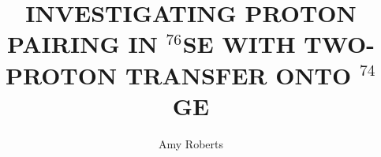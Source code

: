 \documentclass[textrefs,final,noinfo,12pt]{nddiss2ePJL}
\newcommand{\Ge}[1]{$^{#1}$Ge\xspace}
\newcommand{\Se}[1]{$^{#1}$Se\xspace}
\newcommand{\reaction}{$^{74,76}$Ge($^3$He,n)$^{76,78}$Se\xspace}
\newcommand{\zvbb}{$0\nu\beta\beta$\xspace}
\newcommand{\zp}{$0^+$\xspace}
\begin{document}
\frontmatter

\title{INVESTIGATING PROTON PAIRING IN $^{76}$SE WITH TWO-PROTON TRANSFER ONTO $^{74}$GE}
\author{Amy Roberts}

\maketitle
%
%

\makecopyright

\begin{abstract}

\end{abstract}
\end{document}
